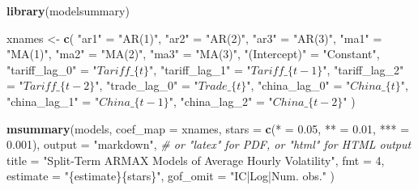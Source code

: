 \documentclass[
]{book}
\newenvironment{Shaded}{\begin{snugshade}}{\end{snugshade}}
\newcommand{\AttributeTok}[1]{\textcolor[rgb]{0.13,0.29,0.53}{#1}}
\newcommand{\CommentTok}[1]{\textcolor[rgb]{0.56,0.35,0.01}{\textit{#1}}}
\newcommand{\DecValTok}[1]{\textcolor[rgb]{0.00,0.00,0.81}{#1}}
\newcommand{\FloatTok}[1]{\textcolor[rgb]{0.00,0.00,0.81}{#1}}
\newcommand{\FunctionTok}[1]{\textcolor[rgb]{0.13,0.29,0.53}{\textbf{#1}}}
\newcommand{\NormalTok}[1]{#1}
\newcommand{\OtherTok}[1]{\textcolor[rgb]{0.56,0.35,0.01}{#1}}
\newcommand{\StringTok}[1]{\textcolor[rgb]{0.31,0.60,0.02}{#1}}
\begin{document}
\begin{Shaded}
\begin{Highlighting}[]
\FunctionTok{library}\NormalTok{(modelsummary)}

\NormalTok{xnames }\OtherTok{\textless{}{-}} \FunctionTok{c}\NormalTok{(}
  \StringTok{"ar1"} \OtherTok{=} \StringTok{"AR(1)"}\NormalTok{,}
  \StringTok{"ar2"} \OtherTok{=} \StringTok{"AR(2)"}\NormalTok{,}
  \StringTok{"ar3"} \OtherTok{=} \StringTok{"AR(3)"}\NormalTok{,}
  \StringTok{"ma1"} \OtherTok{=} \StringTok{"MA(1)"}\NormalTok{,}
  \StringTok{"ma2"} \OtherTok{=} \StringTok{"MA(2)"}\NormalTok{,}
  \StringTok{"ma3"} \OtherTok{=} \StringTok{"MA(3)"}\NormalTok{,}
  \StringTok{"(Intercept)"} \OtherTok{=} \StringTok{"Constant"}\NormalTok{,}
  \StringTok{"tariff\_lag\_0"} \OtherTok{=} \StringTok{"$Tariff\_\{t\}$"}\NormalTok{,}
  \StringTok{"tariff\_lag\_1"} \OtherTok{=} \StringTok{"$Tariff\_\{t{-}1\}$"}\NormalTok{,}
  \StringTok{"tariff\_lag\_2"} \OtherTok{=} \StringTok{"$Tariff\_\{t{-}2\}$"}\NormalTok{,}
  \StringTok{"trade\_lag\_0"} \OtherTok{=} \StringTok{"$Trade\_\{t\}$"}\NormalTok{,}
  \StringTok{"china\_lag\_0"} \OtherTok{=} \StringTok{"$China\_\{t\}$"}\NormalTok{,}
  \StringTok{"china\_lag\_1"} \OtherTok{=} \StringTok{"$China\_\{t{-}1\}$"}\NormalTok{,}
  \StringTok{"china\_lag\_2"} \OtherTok{=} \StringTok{"$China\_\{t{-}2\}$"}
\NormalTok{)}

\FunctionTok{msummary}\NormalTok{(models,}
         \AttributeTok{coef\_map =}\NormalTok{ xnames,}
         \AttributeTok{stars =} \FunctionTok{c}\NormalTok{(}\StringTok{\textquotesingle{}*\textquotesingle{}} \OtherTok{=} \FloatTok{0.05}\NormalTok{, }\StringTok{\textquotesingle{}**\textquotesingle{}} \OtherTok{=} \FloatTok{0.01}\NormalTok{, }\StringTok{\textquotesingle{}***\textquotesingle{}} \OtherTok{=} \FloatTok{0.001}\NormalTok{),}
         \AttributeTok{output =} \StringTok{"markdown"}\NormalTok{,   }\CommentTok{\# or "latex" for PDF, or "html" for HTML output}
         \AttributeTok{title =} \StringTok{"Split{-}Term ARMAX Models of Average Hourly Volatility"}\NormalTok{,}
         \AttributeTok{fmt =} \DecValTok{4}\NormalTok{,}
         \AttributeTok{estimate =} \StringTok{"\{estimate\}\{stars\}"}\NormalTok{,}
         \AttributeTok{gof\_omit =} \StringTok{"IC|Log|Num. obs."}
\NormalTok{)}
\end{Highlighting}
\end{Shaded}
\end{document}

